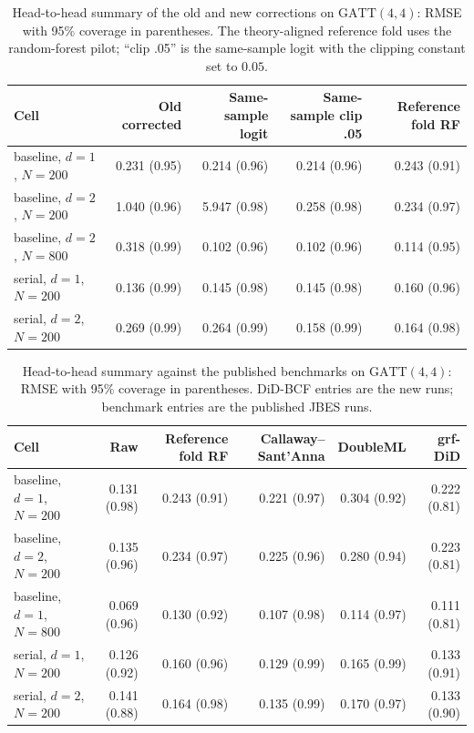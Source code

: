 \documentclass[11pt]{article}
\begin{document}
\clearpage


















\begin{table}[htbp]
\centering
\footnotesize
\caption{Head-to-head summary of the old and new corrections on
$\mathrm{GATT}(4,4)$: RMSE with 95\% coverage in parentheses. The theory-aligned
reference fold uses the random-forest pilot; ``clip .05'' is the same-sample logit with
the clipping constant set to $0.05$.}
\label{tab:headtohead}
\begin{tabular}{lrrrr}
\toprule
Cell & Old corrected & Same-sample logit & Same-sample clip .05 & Reference fold RF \\
\midrule
baseline, $d=1$, $N=200$ & 0.231 (0.95) & 0.214 (0.96) & 0.214 (0.96) & 0.243 (0.91) \\
baseline, $d=2$, $N=200$ & 1.040 (0.96) & 5.947 (0.98) & 0.258 (0.98) & 0.234 (0.97) \\
baseline, $d=2$, $N=800$ & 0.318 (0.99) & 0.102 (0.96) & 0.102 (0.96) & 0.114 (0.95) \\
serial, $d=1$, $N=200$ & 0.136 (0.99) & 0.145 (0.98) & 0.145 (0.98) & 0.160 (0.96) \\
serial, $d=2$, $N=200$ & 0.269 (0.99) & 0.264 (0.99) & 0.158 (0.99) & 0.164 (0.98) \\
\bottomrule
\end{tabular}
\end{table}

\begin{table}[htbp]
\centering
\footnotesize
\caption{Head-to-head summary against the published benchmarks on
$\mathrm{GATT}(4,4)$: RMSE with 95\% coverage in parentheses. DiD-BCF entries are the
new runs; benchmark entries are the published JBES runs.}
\label{tab:benchhead}
\begin{tabular}{lrrrrr}
\toprule
Cell & Raw & Reference fold RF & Callaway--Sant'Anna & DoubleML & grf-DiD \\
\midrule
baseline, $d=1$, $N=200$ & 0.131 (0.98) & 0.243 (0.91) & 0.221 (0.97) & 0.304 (0.92) & 0.222 (0.81) \\
baseline, $d=2$, $N=200$ & 0.135 (0.96) & 0.234 (0.97) & 0.225 (0.96) & 0.280 (0.94) & 0.223 (0.81) \\
baseline, $d=1$, $N=800$ & 0.069 (0.96) & 0.130 (0.92) & 0.107 (0.98) & 0.114 (0.97) & 0.111 (0.81) \\
serial, $d=1$, $N=200$ & 0.126 (0.92) & 0.160 (0.96) & 0.129 (0.99) & 0.165 (0.99) & 0.133 (0.91) \\
serial, $d=2$, $N=200$ & 0.141 (0.88) & 0.164 (0.98) & 0.135 (0.99) & 0.170 (0.97) & 0.133 (0.90) \\
\bottomrule
\end{tabular}
\end{table}
\end{document}

